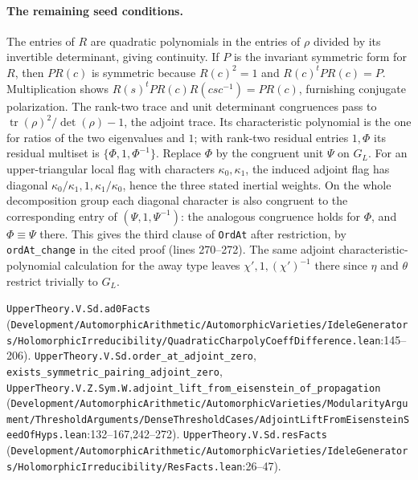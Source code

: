 \paragraph{The remaining seed conditions.}
The entries of $R$ are quadratic polynomials in the entries of $\rho$ divided by its invertible determinant, giving continuity. If $P$ is the invariant symmetric form for $R$, then $P R(c)$ is symmetric because $R(c)^2=1$ and $R(c)^t P R(c)=P$. Multiplication shows $R(s)^tP R(c)R(csc^{-1})=P R(c)$, furnishing conjugate polarization. The rank-two trace and unit determinant congruences pass to $\operatorname{tr}(\rho)^2/\det(\rho)-1$, the adjoint trace. Its characteristic polynomial is the one for ratios of the two eigenvalues and $1$; with rank-two residual entries $1,\Phi$ its residual multiset is $\{\Phi,1,\Phi^{-1}\}$. Replace $\Phi$ by the congruent unit $\Psi$ on $G_L$. For an upper-triangular local flag with characters $\kappa_0,\kappa_1$, the induced adjoint flag has diagonal $\kappa_0/\kappa_1,1,\kappa_1/\kappa_0$, hence the three stated inertial weights. On the whole decomposition group each diagonal character is also congruent to the corresponding entry of $(\Psi,1,\Psi^{-1})$: the analogous congruence holds for $\Phi$, and $\Phi\equiv\Psi$ there. This gives the third clause of \nolinkurl{OrdAt} after restriction, by \nolinkurl{ordAt_change} in the cited proof (lines 270--272). The same adjoint characteristic-polynomial calculation for the away type leaves $\chi',1,(\chi')^{-1}$ there since $\eta$ and $\theta$ restrict trivially to $G_L$.

{\footnotesize \nolinkurl{UpperTheory.V.Sd.ad0Facts} (\nolinkurl{Development/AutomorphicArithmetic/AutomorphicVarieties/IdeleGenerators/HolomorphicIrreducibility/QuadraticCharpolyCoeffDifference.lean}\allowbreak:145--206). \nolinkurl{UpperTheory.V.Sd.order_at_adjoint_zero}, \nolinkurl{exists_symmetric_pairing_adjoint_zero}, \nolinkurl{UpperTheory.V.Z.Sym.W.adjoint_lift_from_eisenstein_of_propagation} (\nolinkurl{Development/AutomorphicArithmetic/AutomorphicVarieties/ModularityArgument/ThresholdArguments/DenseThresholdCases/AdjointLiftFromEisensteinSeedOfHyps.lean}\allowbreak:132--167,242--272). \nolinkurl{UpperTheory.V.Sd.resFacts} (\nolinkurl{Development/AutomorphicArithmetic/AutomorphicVarieties/IdeleGenerators/HolomorphicIrreducibility/ResFacts.lean}\allowbreak:26--47).}

